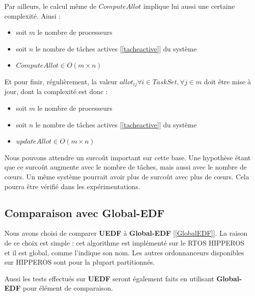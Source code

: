 	Par ailleurs, le calcul même de $Compute Allot$ implique lui aussi une certaine complexité.
	Ainsi :
	\begin{itemize}
		\setlength\itemsep{0.1em}
		\item soit $m$ le nombre de processeurs
		\item soit $n$ le nombre de tâches actives [\ref*{tacheactive}] du système
		\item $Compute Allot \in O(m\times n)$
	\end{itemize}

	Et pour finir, régulièrement, la valeur $allot_{ij} \forall i \in TaskSet, \forall j \in m$ doit être mise 
	à jour, dont la complexité est donc :
	\begin{itemize}
		\setlength\itemsep{0.1em}
			\item soit $m$ le nombre de processeurs
			\item soit $n$ le nombre de tâches actives [\ref*{tacheactive}] du système
			\item $update Allot \in O(m\times n)$
	\end{itemize}

	Nous pouvons attendre un surcoût important sur cette base. Une hypothèse étant que ce surcoût 
	augmente avec le nombre de tâches, mais aussi avec le nombre de cœurs. Un même système pourrait avoir plus 
	de surcoût avec plus de cœurs. Cela pourra être vérifié dans les expérimentations.

	\newpage
	
	
	
	
	
	
	
	
	
	
	
	
	
	
	
	
	
	\subsection{Comparaison avec Global-EDF}
	
	Nous avons choisi de comparer \textbf{UEDF} à \textbf{Global-EDF} [\ref*{GlobalEDF}]. 
	La raison de ce choix est simple : 
	cet algorithme est implémenté sur le RTOS HIPPEROS et il est global, comme 
	l'indique son nom. 
	Les autres ordonnanceurs disponibles sur HIPPEROS sont pour la plupart partitionnés.
 
	Aussi les tests effectués sur \textbf{UEDF} seront également faits en utilisant \textbf{Global-EDF} pour 
	élément de comparaison.\newline
	
